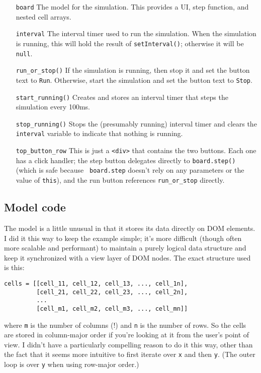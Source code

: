 \documentclass{report}
\begin{document}
\begin{enumerate}
\item[{\tt board}]
  The model for the simulation. This provides a UI, step function, and nested cell arrays.

\item[{\tt interval}]
  The interval timer used to run the simulation. When the simulation is running, this will hold the result of {\tt setInterval()}; otherwise it will be {\tt null}.

\item[{\tt run\_or\_stop()}]
  If the simulation is running, then stop it and set the button text to {\tt Run}. Otherwise, start the simulation and set the button text to {\tt Stop}.

\item[{\tt start\_running()}]
  Creates and stores an interval timer that steps the simulation every 100ms.

\item[{\tt stop\_running()}]
  Stops the (presumably running) interval timer and clears the {\tt interval} variable to indicate that nothing is running.

\item[{\tt top\_button\_row}]
  This is just a \verb|<div>| that contains the two buttons. Each one has a click handler; the step button delegates directly to {\tt board.step()} (which is safe because {\tt
  board.step} doesn't rely on any parameters or the value of {\tt this}), and the run button references {\tt run\_or\_stop} directly.
\end{enumerate}

\subsection{Model code}
      The model is a little unusual in that it stores its data directly on DOM elements. I did it this way to keep the example simple; it's more difficult (though often more scalable and
      performant) to maintain a purely logical data structure and keep it synchronized with a view layer of DOM nodes. The exact structure used is this:

\begin{verbatim}
cells = [[cell_11, cell_12, cell_13, ..., cell_1n],
         [cell_21, cell_22, cell_23, ..., cell_2n],
         ...
         [cell_m1, cell_m2, cell_m3, ..., cell_mn]]
\end{verbatim}

      \noindent where {\tt m} is the number of columns (!) and {\tt n} is the number of rows. So the cells are stored in column-major order if you're looking at it from the user's point of
      view. I didn't have a particularly compelling reason to do it this way, other than the fact that it seems more intuitive to first iterate over {\tt x} and then {\tt y}. (The outer loop
      is over {\tt y} when using row-major order.)
\end{document}
